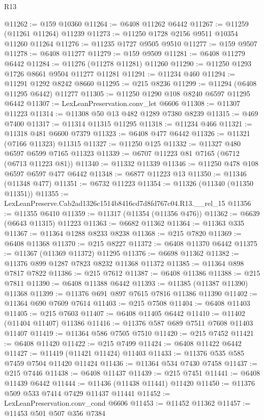 \begin{lexlean}{R13}
\begin{coremodule}
@11262 := @159 @10360
@11264 := @6408 @11262 @6442
@11267 := @11259 (@11261 @11264) @11239
@11273 := @11250 @1728 @2156 @9511 @10354 @11260 @11264
@11276 := @11235 @1727 @9505 @9510
@11277 := @159 @9507
@11278 := @6408 @11277
@11279 := @159 @9509
@11281 := @6408 @11279 @6442
@11284 := @11276 (@11278 @11281) @11260
@11290 := @11250 @1293 @1726 @8661 @9504 @11277 @11281
@11291 := @11234 @460
@11294 := @11291 @1292 @8242 @8660
@11295 := @215 @8236
@11299 := @11294 (@6408 @11295 @6442) @11277
@11305 := @11250 @1290 @108 @8240 @6597 @11295 @6442
@11307 := LexLeanPreservation.conv_let @6606
@11308 := @11307 @11223
@11314 := @11308 @50 @13 @482 @1289 @7380 @8239
@11315 := @469 @7400
@11317 := @11314 @11315 @11295
@11318 := @11234 @466
@11321 := @11318 @481 @6600 @7379
@11323 := @6408 @477 @6442
@11326 := @11321 (@7166 @11323) @11315
@11327 := @11250 @125
@11332 := @11327 @480 @6597 @6599 @7165 @11323
@11339 := @6707 @11223 @81 @7165 (@6712 (@6713 @11223 @81))
@11340 := @11332 @11339
@11346 := @11250 @478 @108 @6597 @6597 @477 @6442
@11348 := @6877 @11223 @13
@11350 := @11346 (@11348 @477)
@11351 := @6732 @11223
@11354 := @11326 (@11340 (@11350 @11351))
@11355 := LexLeanPreserve.Cab2ad1326c1514b8416cd7d8fd767c04.R13.__rel_15
@11356 := @11355 @6410
@11359 := @11317 (@11354 (@11356 @476))
@11362 := @6639 (@6643 @11315) @11223
@11363 := @6682 @11362
@11364 := @11363 @335
@11367 := @11364 @1288 @8233 @8238
@11368 := @215 @7820
@11369 := @6408 @11368
@11370 := @215 @8227
@11372 := @6408 @11370 @6442
@11375 := @11367 (@11369 @11372) @11295
@11376 := @6698 @11362
@11382 := @11376 @899 @1287 @7823 @8232 @11368 @11372
@11385 := @11364 @898 @7817 @7822
@11386 := @215 @7612
@11387 := @6408 @11386
@11388 := @215 @7811
@11390 := @6408 @11388 @6442
@11393 := @11385 (@11387 @11390) @11368
@11399 := @11376 @691 @897 @7615 @7816 @11386 @11390
@11402 := @11364 @690 @7609 @7614
@11403 := @215 @7508
@11404 := @6408 @11403
@11405 := @215 @7603
@11407 := @6408 @11405 @6442
@11410 := @11402 (@11404 @11407) @11386
@11416 := @11376 @587 @689 @7511 @7608 @11403 @11407
@11419 := @11364 @586 @7505 @7510
@11420 := @215 @7452
@11421 := @6408 @11420
@11422 := @215 @7499
@11424 := @6408 @11422 @6442
@11427 := @11419 (@11421 @11424) @11403
@11433 := @11376 @535 @585 @7459 @7504 @11420 @11424
@11436 := @11364 @534 @7430 @7458
@11437 := @215 @7446
@11438 := @6408 @11437
@11439 := @215 @7451
@11441 := @6408 @11439 @6442
@11444 := @11436 (@11438 @11441) @11420
@11450 := @11376 @509 @533 @7414 @7429 @11437 @11441
@11452 := LexLeanPreservation.conv_cond @6606
@11453 := @11452 @11362
@11457 := @11453 @501 @507 @356 @7384

\end{coremodule}
\end{lexlean}
